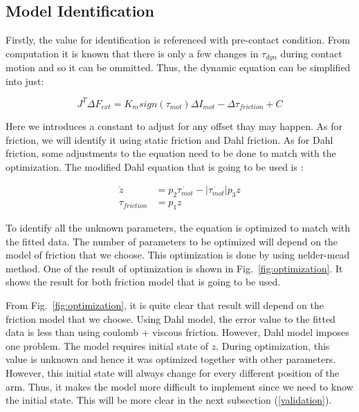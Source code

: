 \documentclass[letterpaper, 10 pt, conference]{ieeeconf}
\newcommand{\fref}[1]{Fig.~\ref{#1}}
\begin{document}
\subsection{Model Identification}
\label{identification}

Firstly, the value for identification is referenced with pre-contact condition. From computation it is known that there is only a few changes in $\tau_{dyn}$ during contact motion and so it can be ommitted. Thus, the dynamic equation can be simplified into just:

\begin{equation}
  J^{T} \Delta F_{ext} = K_{m} sign\left(\tau_{mot}\right) \Delta I_{mot} - \Delta \tau_{friction} + C
\end{equation}
 
Here we introduces a constant to adjust for any offset thay may happen. As for friction, we will identify it using static friction and Dahl friction. As for Dahl friction, some adjustments to the equation need to be done to match with the optimization. The modified Dahl equation that is going to be used is : 

\begin{align}
  \dot{z} &= p_{2 }\dot{\tau_{mot}} - \left|\dot{\tau_{mot}}\right| p_{3} z \\
  \tau_{friction} &= p_{1} z
\end{align}

To identify all the unknown parameters, the equation is optimized to match with the fitted data. The number of parameters to be optimized will depend on the model of friction that we choose. This optimization is done by using nelder-mead method. One of the result of optimization is shown in \fref{fig:optimization}. It shows the result for both friction model that is going to be used. 

From \fref{fig:optimization}, it is quite clear that result will depend on the friction model that we choose. Using Dahl model, the error value to the fitted data is less than using coulomb + viscous friction. However, Dahl model imposes one problem. The model requires initial state of $z$. During optimization, this value is unknown and hence it was optimized together with other parameters. However, this initial state will always change for every different position of the arm. Thus, it makes the model more difficult to implement since we need to know the initial state. This will be more clear in the next subsection (\ref{validation}).
\end{document}

